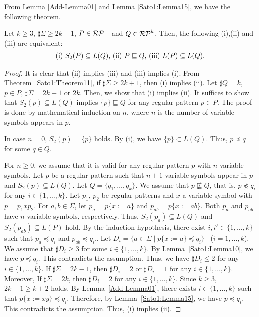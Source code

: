From Lemma \ref{Add-Lemma01} 
and Lemma \ref{Sato1:Lemma15}, 
we have the following theorem.


\begin{thm}\label{Theorem17}
    Let $k \geq 3$, $\sharp\Sigma \geq 2k-1$, $P \in \mathcal{RP}^{+}$ and
    $Q \in \mathcal{RP}^{k}$.
    Then, the following (i),(ii) and (iii) are equivalent:
    \[
        \begin{tabular}{ll}
            $(\mathrm{i})$ $S_{2}(P) \subseteq L(Q)$,
            $(\mathrm{ii})$ $P \sqsubseteq Q$,
            $(\mathrm{iii})$ $L(P) \subseteq L(Q)$.
        \end{tabular}
    \]
\end{thm}


\begin{proof}
    It is clear that (ii) implies (iii) and (iii) implies (i).
    From Theorem~\ref{Sato1:Theorem11}, 
    if $\sharp\Sigma \geq 2k+1$, then
    (i) implies (ii).
    Let $\sharp Q = k$, $p \in P$, $\sharp\Sigma = 2k-1$ or $2k$.
    Then, we show that (i) implies (ii).
    It suffices to show that $S_{2}(p) \subseteq L(Q)$ implies {\color{red}$\{p\} \sqsubseteq Q$}
    for any regular pattern {\color{red}$p \in P$}.
    The proof is done by mathematical induction on $n$, where $n$ is the number of variable symbols appears in $p$.

    In case $n=0$, $S_{2}(p) = \{p\}$ holds.
    By (i), we have {\color{red}$\{p\} \subset L(Q)$}. Thus, $p \preceq q$ for some $q \in Q$.

    For $n \geq 0$,
    we assume that it is valid for any regular pattern $p$
    with $n$ variable symbols.
    Let $p$ be a regular pattern such that $n+1$ variable symbols appear in $p$
    and $S_{2}(p) \subseteq L(Q)$.
    {\color{red} Let $Q = \{q_{1},\ldots,q_{k}\}$.}
    We assume that $p \not\sqsubseteq Q$, that is, {\color{red}$p \not\preceq q_{i}$}
    for any $i \in \{1,\ldots,k\}$.
    {\color{red} Let $p_{1}$, $p_{2}$ be regular patterns and $x$ a variable symbol with $p = p_{1}xp_{2}$.}
    For $a, b \in \Sigma$,
    let $p_{a}=p\{x:=a\}$ and $p_{ab}=p\{x:=ab\}$.
    Both $p_{a}$ and $p_{ab}$ have $n$ variable symbols, respectively.
    Thus, $S_{2}(p_{a}) \subseteq L(Q)$ and $S_{2}(p_{ab}) \subseteq L(P)$ hold.
    By the induction hypothesis,
    there exist $i, i' \in \{1,\ldots,k\}$ such that
    $p_{a} \preceq q_{i}$ and $p_{ab} \preceq q_{i'}$.
    Let $D_{i} = \{a \in \Sigma \mid p\{x:=a\} \preceq q_{i}\}$ \ ($i=1,\ldots,k$).
    We assume that $\sharp D_{i} \geq 3$ for some $i \in \{1,\ldots, k\}$.
    By Lemma~\ref{Sato1:Lemma10}, 
    we have $p \preceq q_{i}$.
    This contradicts the assumption.
    Thus, we have $\sharp D_{i} \leq 2$ for any $i \in \{1,\ldots,k\}$.
    If $\sharp\Sigma = 2k-1$, then
    $\sharp D_{i}=2$ or $\sharp D_{i}=1$ for any $i \in \{1,\ldots,k\}$.
    Moreover,
    If $\sharp\Sigma = 2k$, then
    $\sharp D_{i}=2$ for any $i \in \{1,\ldots,k\}$.
    Since $k \geq 3$, {\color{red} $2k-1 \geq k+2$} holds.
    By Lemma~\ref{Add-Lemma01},
    there exists $i \in \{1,\ldots,k\}$ such that $p\{x:=xy\} \preceq q_{i}$.
    Therefore, by Lemma~\ref{Sato1:Lemma15}, 
    we have $p \preceq q_{i}$.
    This contradicts the assumption.
    Thus, (i) implies (ii).
\end{proof}

